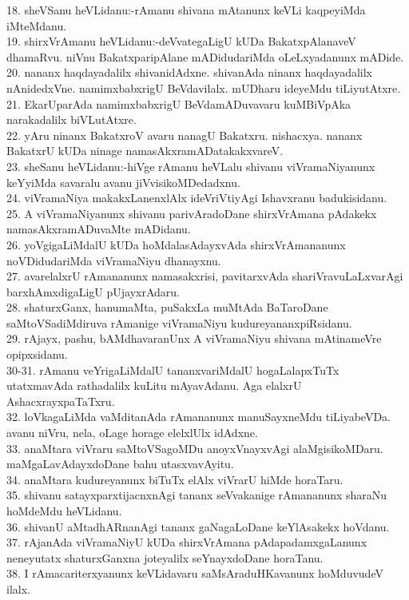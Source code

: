 \documentclass{article}
\begin{document}
18. sheVSanu heVLidanu:-rAmanu shivana mAtanunx keVLi kaqpeyiMda iMteMdanu.\\
19. shirxVrAmanu heVLidanu:-deVvategaLigU kUDa BakatxpAlanaveV dhamaRvu. niVnu BakatxparipAlane mADidudariMda oLeLxyadanunx mADide.\\
20. nananx haqdayadalilx shivanidAdxne. shivanAda ninanx haqdayadalilx nAnidedxVne. namimxbabxrigU BeVdavilalx. mUDharu ideyeMdu tiLiyutAtxre.\\
21. EkarUparAda namimxbabxrigU BeVdamADuvavaru kuMBiVpAka narakadalilx biVLutAtxre.\\
22. yAru ninanx BakatxroV avaru nanagU Bakatxru. nishacxya. nananx BakatxrU kUDa ninage namasAkxramADatakakxvareV.\\
23. sheSanu heVLidanu:-hiVge rAmanu heVLalu shivanu viVramaNiyanunx keYyiMda savaralu avanu jiVvisikoMDedadxnu.\\
24. viVramaNiya makakxLanenxlAlx ideVriVtiyAgi Ishavxranu badukisidanu.\\
25. A viVramaNiyanunx shivanu parivAradoDane shirxVrAmana pAdakekx namasAkxramADuvaMte mADidanu.\\
26. yoVgigaLiMdalU kUDa hoMdalasAdayxvAda shirxVrAmananunx noVDidudariMda viVramaNiyu dhanayxnu.\\
27. avarelalxrU rAmananunx namasakxrisi, pavitarxvAda shariVravuLaLxvarAgi barxhAmxdigaLigU pUjayxrAdaru.\\
28. shaturxGanx, hanumaMta, puSakxLa muMtAda BaTaroDane saMtoVSadiMdiruva rAmanige viVramaNiyu kudureyananxpiRsidanu.\\
29. rAjayx, pashu, bAMdhavaranUnx A viVramaNiyu shivana mAtinameVre opipxsidanu.\\
30-31. rAmanu veYrigaLiMdalU tananxvariMdalU hogaLalapxTuTx utatxmavAda rathadalilx kuLitu mAyavAdanu. Aga elalxrU AshacxrayxpaTaTxru.\\
32. loVkagaLiMda vaMditanAda rAmananunx manuSayxneMdu tiLiyabeVDa. avanu niVru, nela, oLage horage elelxlUlx idAdxne.\\
33. anaMtara viVraru saMtoVSagoMDu anoyxVnayxvAgi alaMgisikoMDaru. maMgaLavAdayxdoDane bahu utasxvavAyitu.\\
34. anaMtara kudureyanunx biTuTx elAlx viVrarU hiMde horaTaru.\\
35. shivanu satayxparxtijacnxnAgi tananx seVvakanige rAmananunx sharaNu hoMdeMdu heVLidanu.\\
36. shivanU aMtadhARnanAgi tananx gaNagaLoDane keYlAsakekx hoVdanu.\\
37. rAjanAda viVramaNiyU kUDa shirxVrAmana pAdapadamxgaLanunx neneyutatx shaturxGanxna joteyalilx seYnayxdoDane horaTanu.\\
38. I rAmacariterxyanunx keVLidavaru saMsAraduHKavanunx hoMduvudeV ilalx.
\end{document}

